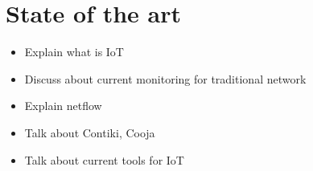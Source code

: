 \section{State of the art}

\begin{itemize}
	\item Explain what is IoT
	\item Discuss about current monitoring for traditional network
	\item Explain netflow
	\item Talk about Contiki, Cooja
	\item Talk about current tools for IoT
\end{itemize}

